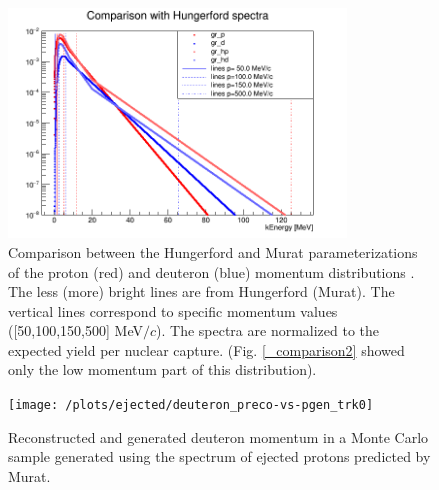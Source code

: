 \documentclass[12pt,a4paper,openright, oneside, titlepage]{book} %
\begin{document}
\begin{figure}[h!]
\centering
\includegraphics[width =0.8\textwidth, keepaspectratio]{new_spectra_2/comparison}
\caption[Comparison of two parameterizaion on the full momentum range]
{Comparison between the Hungerford and Murat parameterizations of the proton (red)  and deuteron (blue)
momentum distributions \cite{Hungerford} \cite{Pasha:spectra}. 
The less (more) bright lines are from Hungerford (Murat). 
The vertical lines correspond to specific momentum values ([50,100,150,500] MeV$/c$). The spectra are normalized to the expected yield per nuclear capture.
(Fig. \ref{_comparison2} showed only the low momentum part of this distribution). }
\label{_comparison}
\end{figure}

\begin{figure}[!htb]
\centering
\texttt{[image: /plots/ejected/deuteron\_preco-vs-pgen\_trk0]}
\caption[Deuteron reconstructed vs generated momentum]
{Reconstructed and generated deuteron momentum in a Monte Carlo sample generated using the spectrum of ejected protons predicted by Murat.}
\label{_deuteron_preco-vs-pgen_trk0}
\end{figure}
\end{document}
